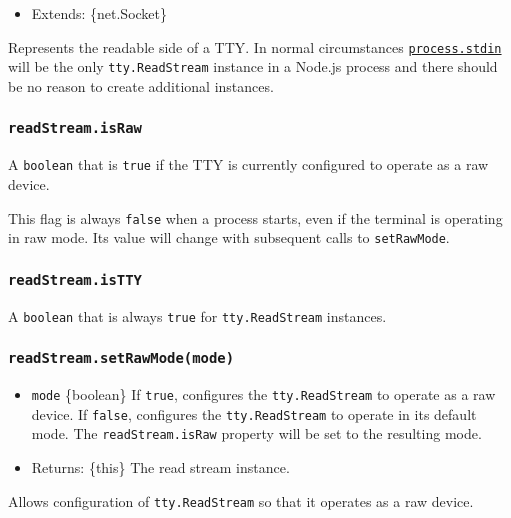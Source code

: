 \begin{itemize}
\tightlist
\item
  Extends: \{net.Socket\}
\end{itemize}

Represents the readable side of a TTY. In normal circumstances
\href{process.md\#processstdin}{\texttt{process.stdin}} will be the only
\texttt{tty.ReadStream} instance in a Node.js process and there should
be no reason to create additional instances.

\subsubsection{\texorpdfstring{\texttt{readStream.isRaw}}{readStream.isRaw}}\label{readstream.israw}

A \texttt{boolean} that is \texttt{true} if the TTY is currently
configured to operate as a raw device.

This flag is always \texttt{false} when a process starts, even if the
terminal is operating in raw mode. Its value will change with subsequent
calls to \texttt{setRawMode}.

\subsubsection{\texorpdfstring{\texttt{readStream.isTTY}}{readStream.isTTY}}\label{readstream.istty}

A \texttt{boolean} that is always \texttt{true} for
\texttt{tty.ReadStream} instances.

\subsubsection{\texorpdfstring{\texttt{readStream.setRawMode(mode)}}{readStream.setRawMode(mode)}}\label{readstream.setrawmodemode}

\begin{itemize}
\tightlist
\item
  \texttt{mode} \{boolean\} If \texttt{true}, configures the
  \texttt{tty.ReadStream} to operate as a raw device. If \texttt{false},
  configures the \texttt{tty.ReadStream} to operate in its default mode.
  The \texttt{readStream.isRaw} property will be set to the resulting
  mode.
\item
  Returns: \{this\} The read stream instance.
\end{itemize}

Allows configuration of \texttt{tty.ReadStream} so that it operates as a
raw device.

